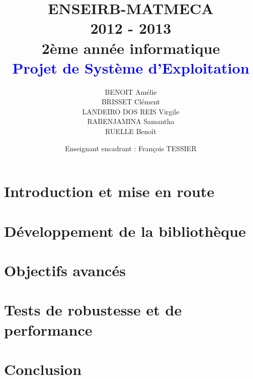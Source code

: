 \documentclass[a4paper,12pt]{article}
\title{
	\normalsize{ENSEIRB-MATMECA \\ 
	2012 - 2013 \\
	2ème année informatique} \\
	\vspace{15mm}
	\Huge{\textcolor{blue}{Projet de Système d'Exploitation }}
}
\author{ BENOIT Amélie \\ BRISSET Clément \\ LANDEIRO DOS REIS Virgile \\ RABENJAMINA Samantha \\ RUELLE Benoît}
\date{
	\normalsize{Enseignant encadrant : François TESSIER}
}
\begin{document}
\maketitle
\clearpage
\tableofcontents
\clearpage

\section{Introduction et mise en route}


\section{Développement de la bibliothèque}


\section{Objectifs avancés}


\section{Tests de robustesse et de performance}


\section{Conclusion}

\end{document}

